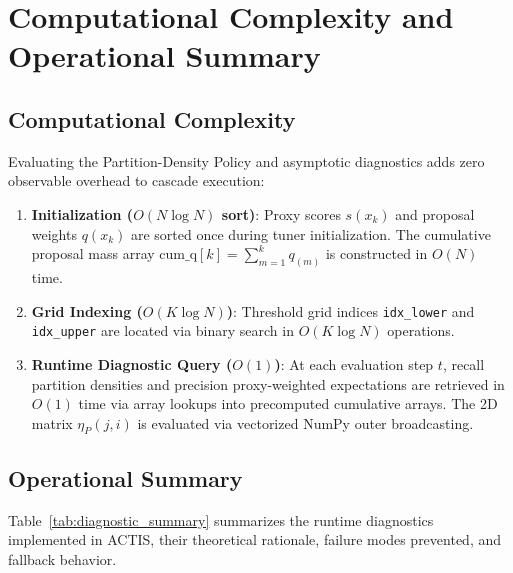 \documentclass[11pt,a4paper]{article}
\begin{document}
\newpage
\section{Computational Complexity and Operational Summary}

\subsection{Computational Complexity}
Evaluating the Partition-Density Policy and asymptotic diagnostics adds zero observable overhead to cascade execution:
\begin{enumerate}[leftmargin=*]
    \item \textbf{Initialization ($O(N \log N)$ sort)}: Proxy scores $s(x_k)$ and proposal weights $q(x_k)$ are sorted once during tuner initialization. The cumulative proposal mass array $\text{cum\_q}[k] = \sum_{m=1}^k q_{(m)}$ is constructed in $O(N)$ time.
    \item \textbf{Grid Indexing ($O(K \log N)$)}: Threshold grid indices \texttt{idx\_lower} and \texttt{idx\_upper} are located via binary search in $O(K \log N)$ operations.
    \item \textbf{Runtime Diagnostic Query ($O(1)$)}: At each evaluation step $t$, recall partition densities and precision proxy-weighted expectations are retrieved in $O(1)$ time via array lookups into precomputed cumulative arrays. The 2D matrix $\eta_P(j, i)$ is evaluated via vectorized NumPy outer broadcasting.
\end{enumerate}

\subsection{Operational Summary}
Table~\ref{tab:diagnostic_summary} summarizes the runtime diagnostics implemented in ACTIS, their theoretical rationale, failure modes prevented, and fallback behavior.
\end{document}
